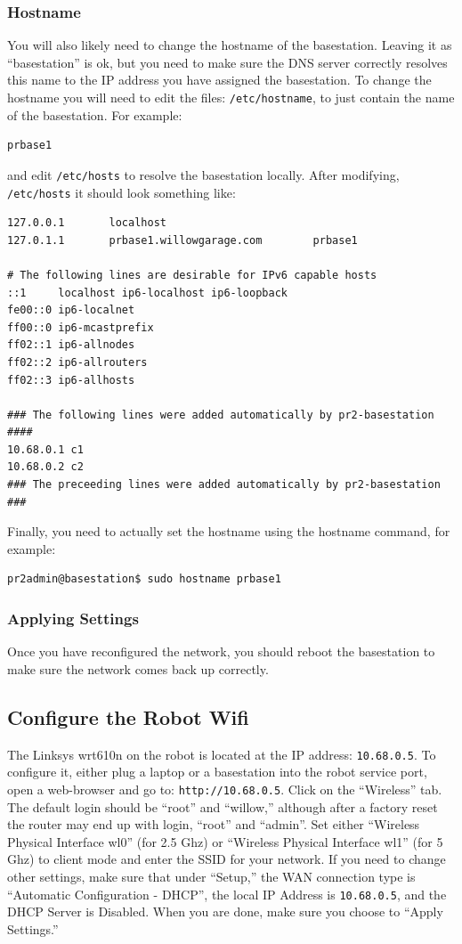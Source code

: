 \subsubsection{Hostname}
You will also likely need to change the hostname of the basestation.
Leaving it as ``basestation'' is ok, but you need to make sure the DNS
server correctly resolves this name to the IP address you have
assigned the basestation.  To change the hostname you will need to
edit the files: \texttt{/etc/hostname}, to just contain the name of
the basestation.  For example:
\begin{verbatim}
prbase1
\end{verbatim}
and edit \texttt{/etc/hosts} to resolve the basestation locally.
After modifying, \texttt{/etc/hosts} it should look something like:
\begin{verbatim}
127.0.0.1       localhost
127.0.1.1       prbase1.willowgarage.com        prbase1

# The following lines are desirable for IPv6 capable hosts
::1     localhost ip6-localhost ip6-loopback
fe00::0 ip6-localnet
ff00::0 ip6-mcastprefix
ff02::1 ip6-allnodes
ff02::2 ip6-allrouters
ff02::3 ip6-allhosts

### The following lines were added automatically by pr2-basestation ####
10.68.0.1 c1
10.68.0.2 c2
### The preceeding lines were added automatically by pr2-basestation ###
\end{verbatim}
Finally, you need to actually set the hostname using the hostname command, for example:
\begin{verbatim}
pr2admin@basestation$ sudo hostname prbase1
\end{verbatim}

\subsubsection{Applying Settings}
Once you have reconfigured the network, you should reboot the
basestation to make sure the network comes back up correctly.

\subsection{Configure the Robot Wifi}
The Linksys wrt610n on the robot is located at the IP address:
\texttt{10.68.0.5}. To configure it, either plug a laptop or a
basestation into the robot service port, open a web-browser and go to:
\texttt{http://10.68.0.5}.  Click on the ``Wireless'' tab.  The
default login should be ``root'' and ``willow,'' although after a
factory reset the router may end up with login, ``root'' and
``admin''.  Set either ``Wireless Physical Interface wl0'' (for 2.5
Ghz) or ``Wireless Physical Interface wl1'' (for 5 Ghz) to client mode
and enter the SSID for your network.  If you need to change other
settings, make sure that under ``Setup,'' the WAN connection type is
``Automatic Configuration - DHCP'', the local IP Address is
\texttt{10.68.0.5}, and the DHCP Server is Disabled.  When you are
done, make sure you choose to ``Apply Settings.''

